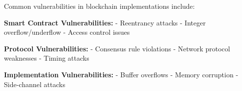 Common vulnerabilities in blockchain implementations include:

\textbf{Smart Contract Vulnerabilities:}
- Reentrancy attacks
- Integer overflow/underflow
- Access control issues

\textbf{Protocol Vulnerabilities:}
- Consensus rule violations
- Network protocol weaknesses
- Timing attacks

\textbf{Implementation Vulnerabilities:}
- Buffer overflows
- Memory corruption
- Side-channel attacks